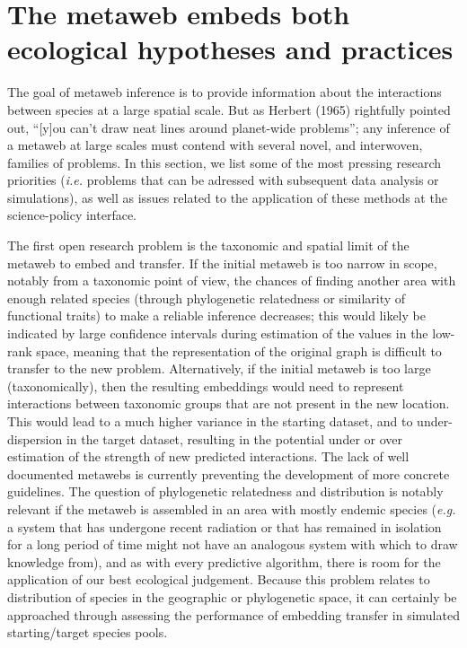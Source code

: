 \documentclass[11pt]{article}
\begin{document}
\hypertarget{the-metaweb-embeds-both-ecological-hypotheses-and-practices}{%
\section{The metaweb embeds both ecological hypotheses and
practices}\label{the-metaweb-embeds-both-ecological-hypotheses-and-practices}}

The goal of metaweb inference is to provide information about the
interactions between species at a large spatial scale. But as Herbert
(1965) rightfully pointed out, ``{[}y{]}ou can't draw neat lines around
planet-wide problems''; any inference of a metaweb at large scales must
contend with several novel, and interwoven, families of problems. In
this section, we list some of the most pressing research priorities
(\emph{i.e.} problems that can be adressed with subsequent data analysis
or simulations), as well as issues related to the application of these
methods at the science-policy interface.

The first open research problem is the taxonomic and spatial limit of
the metaweb to embed and transfer. If the initial metaweb is too narrow
in scope, notably from a taxonomic point of view, the chances of finding
another area with enough related species (through phylogenetic
relatedness or similarity of functional traits) to make a reliable
inference decreases; this would likely be indicated by large confidence
intervals during estimation of the values in the low-rank space, meaning
that the representation of the original graph is difficult to transfer
to the new problem. Alternatively, if the initial metaweb is too large
(taxonomically), then the resulting embeddings would need to represent
interactions between taxonomic groups that are not present in the new
location. This would lead to a much higher variance in the starting
dataset, and to under-dispersion in the target dataset, resulting in the
potential under or over estimation of the strength of new predicted
interactions. The lack of well documented metawebs is currently
preventing the development of more concrete guidelines. The question of
phylogenetic relatedness and distribution is notably relevant if the
metaweb is assembled in an area with mostly endemic species (\emph{e.g.}
a system that has undergone recent radiation or that has remained in
isolation for a long period of time might not have an analogous system
with which to draw knowledge from), and as with every predictive
algorithm, there is room for the application of our best ecological
judgement. Because this problem relates to distribution of species in
the geographic or phylogenetic space, it can certainly be approached
through assessing the performance of embedding transfer in simulated
starting/target species pools.
\end{document}
